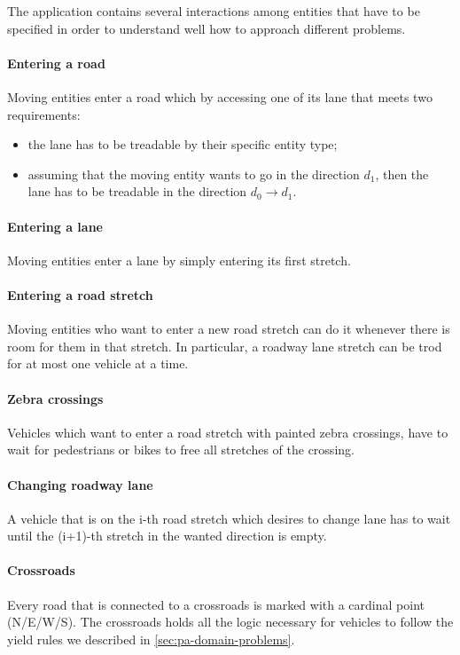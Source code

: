 
The application contains several interactions among entities that have to be
specified in order to understand well how to approach different problems.

\paragraph{Entering a road} Moving entities enter a road which by accessing
one of its lane that meets two requirements:

\begin{itemize}
  \item the lane has to be treadable by their specific entity type;
  \item assuming that the moving entity wants to go in the direction $d_1$,
    then the lane has to be treadable in the direction $d_0 \rightarrow d_1$.
\end{itemize}

\paragraph{Entering a lane}
Moving entities enter a lane by simply entering its first stretch.

\paragraph{Entering a road stretch}
Moving entities who want to enter a new road stretch
can do it whenever there is room for them in that stretch. 
In particular, a roadway lane stretch can be trod for at most 
one vehicle at a time.

\paragraph{Zebra crossings} Vehicles which want to enter a road stretch 
with painted zebra crossings, have to wait for 
pedestrians or bikes to free all stretches of the crossing.

\paragraph{Changing roadway lane} A vehicle that is on the i-th road stretch
which desires to change lane has to wait until the (i+1)-th stretch in the
wanted direction is empty.

\paragraph{Crossroads} Every road that is connected to a crossroads is marked
with a cardinal point (N/E/W/S). The crossroads holds all the logic necessary
for vehicles to follow the yield rules we described in
\ref{sec:pa-domain-problems}.

